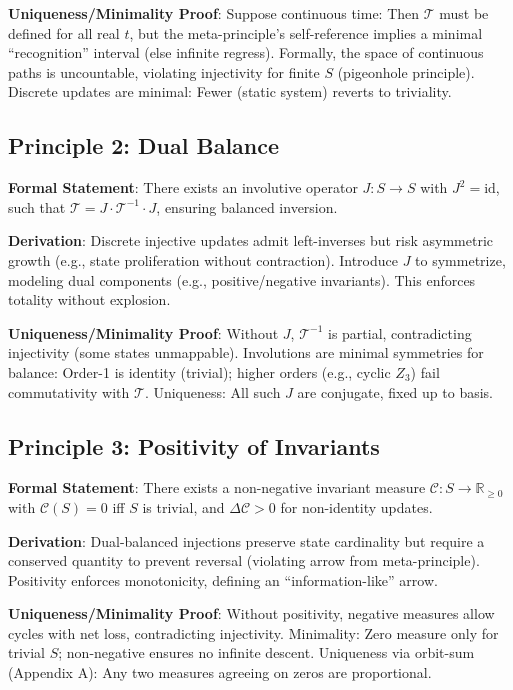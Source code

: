 \documentclass[twocolumn,prd,amsmath,amssymb,aps,superscriptaddress,nofootinbib]{revtex4-2}
\begin{document}
\textbf{Uniqueness/Minimality Proof}: Suppose continuous time: Then $\mathcal{T}$ must be defined for all real $t$, but the meta-principle's self-reference implies a minimal ``recognition'' interval (else infinite regress). Formally, the space of continuous paths is uncountable, violating injectivity for finite $S$ (pigeonhole principle). Discrete updates are minimal: Fewer (static system) reverts to triviality.

\subsection{Principle 2: Dual Balance}
\label{subsec:principle-2}

\textbf{Formal Statement}: There exists an involutive operator $J: S \to S$ with $J^2 = \mathrm{id}$, such that $\mathcal{T} = J \cdot \mathcal{T}^{-1} \cdot J$, ensuring balanced inversion.

\textbf{Derivation}: Discrete injective updates admit left-inverses but risk asymmetric growth (e.g., state proliferation without contraction). Introduce $J$ to symmetrize, modeling dual components (e.g., positive/negative invariants). This enforces totality without explosion.

\textbf{Uniqueness/Minimality Proof}: Without $J$, $\mathcal{T}^{-1}$ is partial, contradicting injectivity (some states unmappable). Involutions are minimal symmetries for balance: Order-1 is identity (trivial); higher orders (e.g., cyclic $Z_3$) fail commutativity with $\mathcal{T}$. Uniqueness: All such $J$ are conjugate, fixed up to basis.

\subsection{Principle 3: Positivity of Invariants}
\label{subsec:principle-3}

\textbf{Formal Statement}: There exists a non-negative invariant measure $\mathcal{C}: S \to \mathbb{R}_{\geq 0}$ with $\mathcal{C}(S) = 0$ iff $S$ is trivial, and $\Delta \mathcal{C} > 0$ for non-identity updates.

\textbf{Derivation}: Dual-balanced injections preserve state cardinality but require a conserved quantity to prevent reversal (violating arrow from meta-principle). Positivity enforces monotonicity, defining an ``information-like'' arrow.

\textbf{Uniqueness/Minimality Proof}: Without positivity, negative measures allow cycles with net loss, contradicting injectivity. Minimality: Zero measure only for trivial $S$; non-negative ensures no infinite descent. Uniqueness via orbit-sum (Appendix A): Any two measures agreeing on zeros are proportional.
\end{document}
